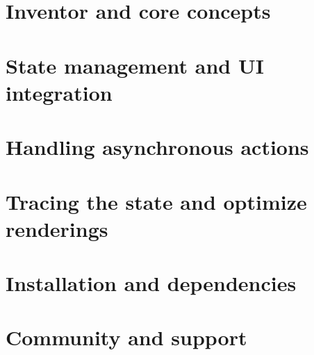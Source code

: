 
\section{Inventor and core concepts}
\label{sec:setState}



\section{State management and UI integration}
\label{sec:setState}



\section{Handling asynchronous actions}
\label{sec:setState}



\section{Tracing the state and optimize renderings}
\label{sec:setState}



\section{Installation and dependencies}
\label{sec:setState}



\section{Community and support}
\label{sec:setState}

